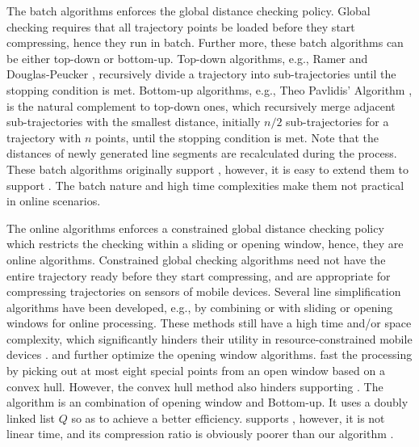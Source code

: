 The batch algorithms enforces the global distance checking policy.
Global checking requires that all trajectory points be loaded before they start compressing, hence they run in batch.
Further more, these batch algorithms can be either top-down or bottom-up.
Top-down algorithms, e.g., Ramer \cite{Ramer:Split} and Douglas-Peucker \cite{Douglas:Peucker}, recursively divide a trajectory into sub-trajectories until the stopping condition is met.
%
Bottom-up algorithms, e.g., Theo Pavlidis' Algorithm \cite{Pavlidis:Segment}, is the natural complement to top-down ones, which recursively merge adjacent sub-trajectories with the smallest distance, initially $n/2$  sub-trajectories for a trajectory with $n$ points, until the stopping condition is met.
Note that the distances of newly generated line segments are recalculated during the process.
%
These batch algorithms originally support \ped, however, it is easy to extend them to support \sed.
%
The batch nature and high time complexities make them not practical in online scenarios.


The online algorithms enforces a constrained global distance checking policy which restricts the checking within a sliding or opening window, hence, they are online algorithms.
Constrained global checking algorithms need not have the entire trajectory ready before they start compressing, and are appropriate for compressing trajectories on sensors of mobile devices.
Several line simplification algorithms have been developed, e.g., by combining \dpa or \pavlidis with sliding or opening windows for online processing\cite{Meratnia:Spatiotemporal}. %
These methods still have a high time and/or space complexity, which significantly hinders their utility in resource-constrained mobile devices \cite{Liu:BQS}.
%
\bqsa \cite{Liu:BQS} and \squishe\cite{Muckell:Compression} further optimize the opening window algorithms.
%
\bqsa \cite{Liu:BQS} fast the processing by picking out at most eight special points from an open window based on a convex hull. However, the convex hull method also hinders \bqsa supporting \sed.
%
The \squishe\cite{Muckell:Compression} algorithm is an combination of {opening} window and Bottom-up. It  uses a doubly linked list $Q$ so as to achieve a better efficiency. \squishe supports \sed, however, it is not linear time, and its compression ratio is obviously poorer than our algorithm \cist.

